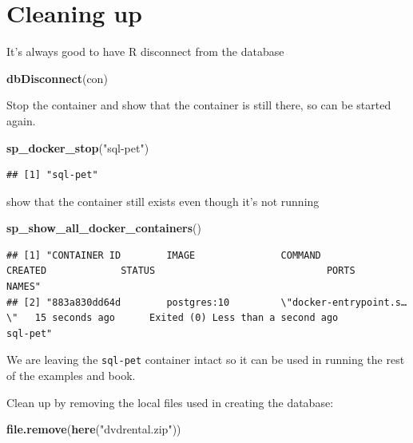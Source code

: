 \documentclass[]{book}
\newenvironment{Shaded}{\begin{snugshade}}{\end{snugshade}}
\newcommand{\KeywordTok}[1]{\textcolor[rgb]{0.13,0.29,0.53}{\textbf{#1}}}
\newcommand{\NormalTok}[1]{#1}
\newcommand{\StringTok}[1]{\textcolor[rgb]{0.31,0.60,0.02}{#1}}
\theoremstyle{definition}
\theoremstyle{definition}
\theoremstyle{definition}
\theoremstyle{remark}
\begin{document}
\hypertarget{cleaning-up-1}{%
\section{Cleaning up}\label{cleaning-up-1}}

It's always good to have R disconnect from the database

\begin{Shaded}
\begin{Highlighting}[]
\KeywordTok{dbDisconnect}\NormalTok{(con)}
\end{Highlighting}
\end{Shaded}

Stop the container and show that the container is still there, so can be
started again.

\begin{Shaded}
\begin{Highlighting}[]
\KeywordTok{sp_docker_stop}\NormalTok{(}\StringTok{"sql-pet"}\NormalTok{)}
\end{Highlighting}
\end{Shaded}

\begin{verbatim}
## [1] "sql-pet"
\end{verbatim}

show that the container still exists even though it's not running

\begin{Shaded}
\begin{Highlighting}[]
\KeywordTok{sp_show_all_docker_containers}\NormalTok{()}
\end{Highlighting}
\end{Shaded}

\begin{verbatim}
## [1] "CONTAINER ID        IMAGE               COMMAND                  CREATED             STATUS                              PORTS               NAMES"    
## [2] "883a830dd64d        postgres:10         \"docker-entrypoint.s…\"   15 seconds ago      Exited (0) Less than a second ago                       sql-pet"
\end{verbatim}

We are leaving the \texttt{sql-pet} container intact so it can be used
in running the rest of the examples and book.

Clean up by removing the local files used in creating the database:

\begin{Shaded}
\begin{Highlighting}[]
\KeywordTok{file.remove}\NormalTok{(}\KeywordTok{here}\NormalTok{(}\StringTok{"dvdrental.zip"}\NormalTok{))}
\end{Highlighting}
\end{Shaded}
\end{document}
